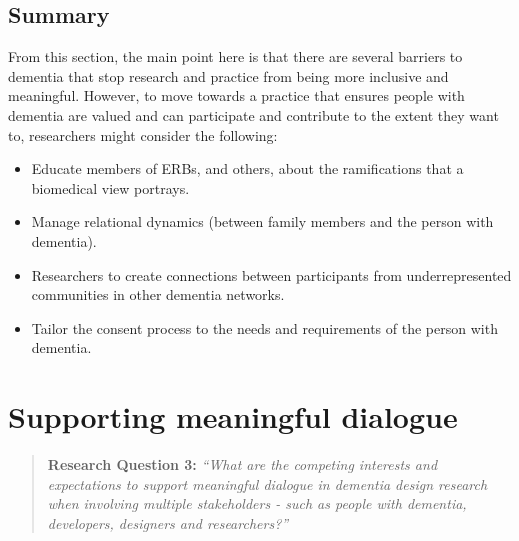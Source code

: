\subsection{Summary}
\label{EthicsSummary}
From this section, the main point here is that there are several barriers to dementia that stop research and practice from being more inclusive and meaningful. However, to move towards a practice that ensures people with dementia are valued and can participate and contribute to the extent they want to, researchers might consider the following:
\begin{itemize}
    \item Educate members of ERBs, and others, about the ramifications that a biomedical view portrays.
    \item Manage relational dynamics (between family members and the person with dementia).
    \item Researchers to create connections between participants from underrepresented communities in other dementia networks.
    \item Tailor the consent process to the needs and requirements of the person with dementia.
\end{itemize}

\section{Supporting meaningful dialogue}
\label{Discussion:RQ3}
\begin{quote}
\textbf{    Research Question 3:
}    
\textit{ “What are the competing interests and expectations to support meaningful dialogue in dementia design research when involving multiple stakeholders - such as people with dementia, developers, designers and researchers?”}
\end{quote}

